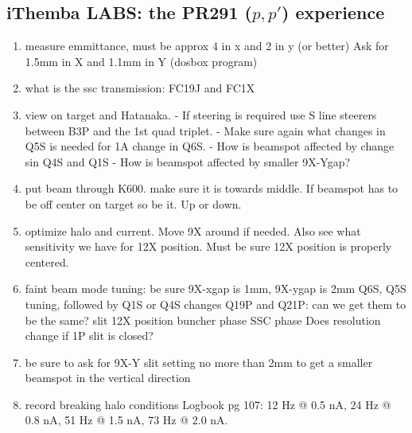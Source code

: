 \documentclass[11pt]{report}
\begin{document}


\subsection{iThemba LABS: the PR291 ($p,p'$) experience}
\begin{enumerate}
\item measure emmittance, must be approx 4 in x and 2 in y (or better)
Ask for 1.5mm in X and 1.1mm in Y (dosbox program)
\item what is the ssc transmission: FC19J and FC1X
\item  view on target and Hatanaka. 
- If steering is required use S line steerers between B3P and the 1st
quad triplet.
- Make sure again what changes in Q5S is needed for 1A change in Q6S.
- How is beamspot affected by change sin Q4S and Q1S
- How is beamspot affected by smaller 9X-Ygap?
\item  put beam through K600. make sure it is towards middle. If beamspot
has to be off center on target so be it. Up or down.
\item optimize halo and current. Move 9X around if needed. Also see what 
sensitivity we have for 12X position. Must be sure 12X position is
properly centered.
\item faint beam mode tuning:
be sure 9X-xgap is 1mm, 9X-ygap is 2mm
Q6S, Q5S tuning, followed by Q1S or Q4S changes 
Q19P and Q21P: can we get them to be the same?
slit 12X position
buncher phase
SSC phase 
Does resolution change if 1P slit is closed?
\item be sure to ask for 9X-Y slit setting no more than 2mm  to get a smaller beamspot in the vertical direction
\item record breaking halo conditions
Logbook pg 107: 
    12 Hz @ 0.5 nA,
    24 Hz @ 0.8 nA,
    51 Hz @ 1.5 nA,
    73 Hz @ 2.0 nA.
\end{enumerate}
\end{document}
